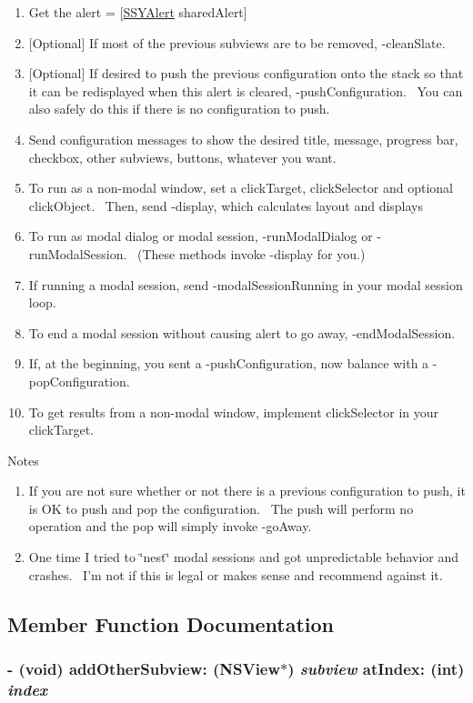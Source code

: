 \begin{enumerate}
\item Get the alert = \mbox{[}\hyperlink{interface_s_s_y_alert}{SSYAlert} sharedAlert\mbox{]} \item \mbox{[}Optional\mbox{]} If most of the previous subviews are to be removed, -cleanSlate. \item \mbox{[}Optional\mbox{]} If desired to push the previous configuration onto the stack so that it can be redisplayed when this alert is cleared, -pushConfiguration.~ You can also safely do this if there is no configuration to push. \item Send configuration messages to show the desired title, message, progress bar, checkbox, other subviews, buttons, whatever you want. \item To run as a non-modal window, set a clickTarget, clickSelector and optional clickObject.~ Then, send -display, which calculates layout and displays \item To run as modal dialog or modal session, -runModalDialog or -runModalSession.~ (These methods invoke -display for you.) \item If running a modal session, send -modalSessionRunning in your modal session loop. \item To end a modal session without causing alert to go away, -endModalSession. \item If, at the beginning, you sent a -pushConfiguration, now balance with a -popConfiguration. \item To get results from a non-modal window, implement clickSelector in your clickTarget.\end{enumerate}


Notes  \begin{enumerate}
\item If you are not sure whether or not there is a previous configuration to push, it is OK to push and pop the configuration.~ The push will perform no operation and the pop will simply invoke -goAway.  \item One time I tried to \char`\"{}nest\char`\"{} modal sessions and got unpredictable behavior and crashes.~ I'm not if this is legal or makes sense and recommend against it.  \end{enumerate}


\subsection{Member Function Documentation}
\hypertarget{interface_s_s_y_alert_49b267a37e1ccc629b11d792cf774c2d}{
\subsubsection[{addOtherSubview:atIndex:}]{\setlength{\rightskip}{0pt plus 5cm}- (void) addOtherSubview: (NSView$\ast$) {\em subview}\/ atIndex: (int) {\em index}}}
\label{interface_s_s_y_alert_49b267a37e1ccc629b11d792cf774c2d}


